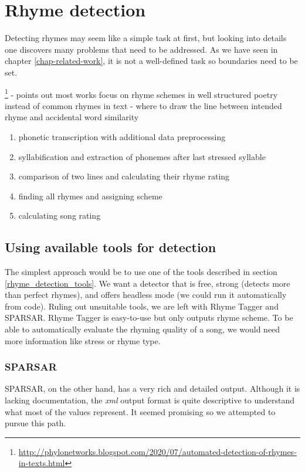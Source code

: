 
\chapter{Rhyme detection}\label{chap-rhyme-analysis}
Detecting rhymes may seem like a simple task at first, but looking into details one discovers many problems that need to be addressed. As we have seen in chapter \ref{chap-related-work}, it is not a well-defined task so boundaries need to be set.


\footnote{\url{http://phylonetworks.blogspot.com/2020/07/automated-detection-of-rhymes-in-texts.html}}
- points out most works focus on rhyme schemes in well structured poetry instead of common rhymes in text
- where to draw the line between intended rhyme and accidental word similarity

\begin{enumerate}
	\item phonetic transcription with additional data preprocessing	
	\item syllabification and extraction of phonemes after last stressed syllable
	\item comparison of two lines and calculating their rhyme rating  
	\item finding all rhymes and assigning scheme
	\item calculating song rating
\end{enumerate}

\section{Using available tools for detection}
The simplest approach would be to use one of the tools described in section \ref{rhyme_detection_tools}. We want a detector that is free, strong (detects more than perfect rhymes), and offers headless mode (we could run it automatically from code). Ruling out unsuitable tools, we are left with Rhyme Tagger and SPARSAR. Rhyme Tagger is easy-to-use but only outputs rhyme scheme. To be able to automatically evaluate the rhyming quality of a song, we would need more information like stress or rhyme type.

\subsection*{SPARSAR}
SPARSAR, on the other hand, has a very rich and detailed output. Although it is lacking documentation, the \textit{xml} output format is quite descriptive to understand what most of the values represent. It seemed promising so we attempted to pursue this path.

